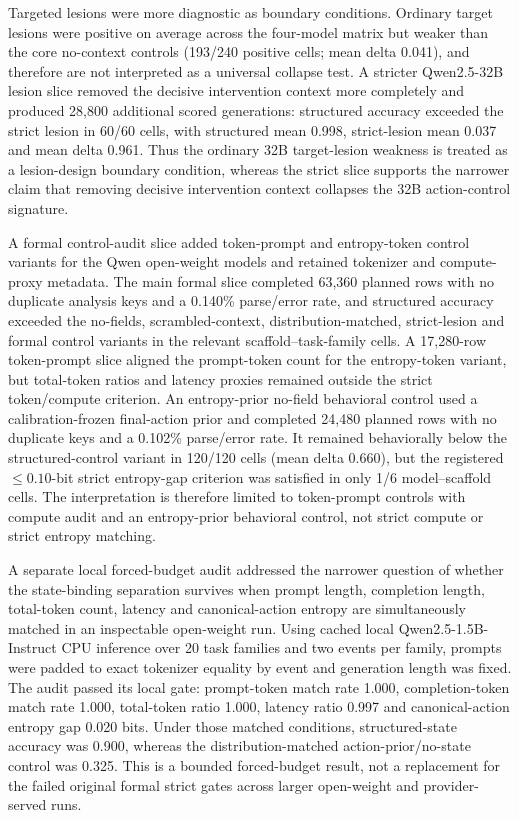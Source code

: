 ﻿\documentclass[preprint,12pt,authoryear]{elsarticle}
\begin{document}
Targeted lesions were more diagnostic as boundary conditions. Ordinary target lesions were positive on average across the four-model matrix but weaker than the core no-context controls (193/240 positive cells; mean delta 0.041), and therefore are not interpreted as a universal collapse test. A stricter Qwen2.5-32B lesion slice removed the decisive intervention context more completely and produced 28,800 additional scored generations: structured accuracy exceeded the strict lesion in 60/60 cells, with structured mean 0.998, strict-lesion mean 0.037 and mean delta 0.961. Thus the ordinary 32B target-lesion weakness is treated as a lesion-design boundary condition, whereas the strict slice supports the narrower claim that removing decisive intervention context collapses the 32B action-control signature.

A formal control-audit slice added token-prompt and entropy-token control variants for the Qwen open-weight models and retained tokenizer and compute-proxy metadata. The main formal slice completed 63,360 planned rows with no duplicate analysis keys and a 0.140\% parse/error rate, and structured accuracy exceeded the no-fields, scrambled-context, distribution-matched, strict-lesion and formal control variants in the relevant scaffold--task-family cells. A 17,280-row token-prompt slice aligned the prompt-token count for the entropy-token variant, but total-token ratios and latency proxies remained outside the strict token/compute criterion. An entropy-prior no-field behavioral control used a calibration-frozen final-action prior and completed 24,480 planned rows with no duplicate keys and a 0.102\% parse/error rate. It remained behaviorally below the structured-control variant in 120/120 cells (mean delta 0.660), but the registered \(\leq 0.10\)-bit strict entropy-gap criterion was satisfied in only 1/6 model--scaffold cells. The interpretation is therefore limited to token-prompt controls with compute audit and an entropy-prior behavioral control, not strict compute or strict entropy matching.

A separate local forced-budget audit addressed the narrower question of whether the state-binding separation survives when prompt length, completion length, total-token count, latency and canonical-action entropy are simultaneously matched in an inspectable open-weight run. Using cached local Qwen2.5-1.5B-Instruct CPU inference over 20 task families and two events per family, prompts were padded to exact tokenizer equality by event and generation length was fixed. The audit passed its local gate: prompt-token match rate 1.000, completion-token match rate 1.000, total-token ratio 1.000, latency ratio 0.997 and canonical-action entropy gap 0.020 bits. Under those matched conditions, structured-state accuracy was 0.900, whereas the distribution-matched action-prior/no-state control was 0.325. This is a bounded forced-budget result, not a replacement for the failed original formal strict gates across larger open-weight and provider-served runs.
\end{document}
